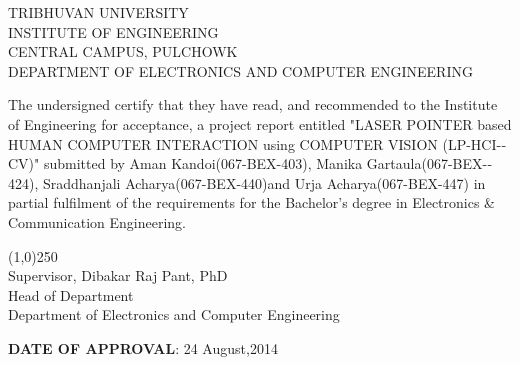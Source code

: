 
    
      \vspace{1cm}  
      \begin{center} 
       TRIBHUVAN UNIVERSITY \\
        INSTITUTE OF ENGINEERING \\
        CENTRAL CAMPUS, PULCHOWK\\
        DEPARTMENT OF ELECTRONICS AND COMPUTER ENGINEERING\\
       \end{center}
       
        \vspace{1cm}
        
        The undersigned certify that they have read, and recommended to the Institute of
Engineering for acceptance, a project report entitled "LASER POINTER based HUMAN­ COMPUTER INTERACTION using COMPUTER VISION (LP-­HCI-­CV)" submitted by Aman Kandoi(067­-BEX­-403), 
Manika Gartaula(067­-BEX-­424), 
Sraddhanjali Acharya(067-­BEX­-440)and 
Urja Acharya(067­-BEX­-447) in partial fulfilment of the requirements for the Bachelor's degree in Electronics \& Communication Engineering.

		\vspace{1.5cm}
		\begin{flushleft}
		
        \line(1,0){250}\\
		Supervisor, Dibakar Raj Pant, PhD\\
		Head of Department\\
		Department of Electronics and Computer Engineering\\
		\end{flushleft}


		\vspace{1cm}
		\textbf{DATE OF APPROVAL}: 24 August,2014    
        
        
        
    


        
        
    
